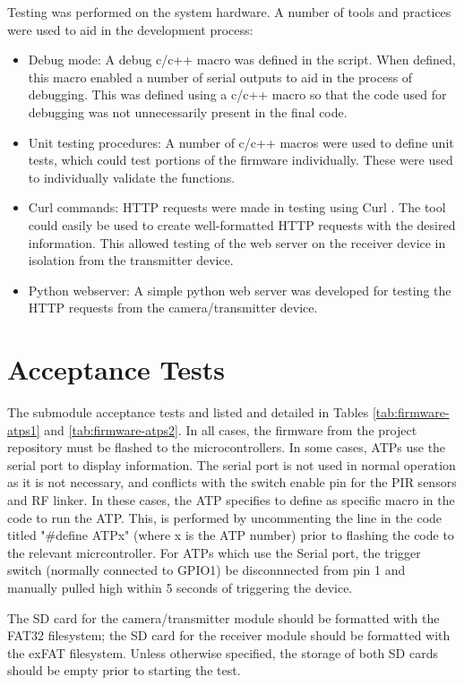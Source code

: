 \documentclass[class=report,11pt,crop=false]{standalone}
\begin{document}
Testing was performed on the system hardware. A number of tools and practices were used to aid in the development process:

\begin{itemize}
    \item Debug mode: A debug c/c++ macro was defined in the script. When defined, this macro enabled a number of serial outputs to aid in the process of debugging. This was defined using a c/c++ macro so that the code used for debugging was not unnecessarily present in the final code.
    \item Unit testing procedures: A number of c/c++ macros were used to define unit tests, which could test portions of the firmware individually. These were used to individually validate the functions.
    \item Curl commands: HTTP requests were made in testing using Curl \cite{hostetter1997curl}. The tool could easily be used to create well-formatted HTTP requests with the desired information. This allowed testing of the web server on the receiver device in isolation from the transmitter device.
    \item Python webserver: A simple python web server was developed for testing the HTTP requests from the camera/transmitter device.
\end{itemize}


\section{Acceptance Tests \label{s:firmware-atps}}

The submodule acceptance tests and listed and detailed in Tables \ref{tab:firmware-atps1} and \ref{tab:firmware-atps2}. In all cases, the firmware from the project repository must be flashed to the microcontrollers. In some cases, ATPs use the serial port to display information. The serial port is not used in normal operation as it is not necessary, and conflicts with the switch enable pin for the PIR sensors and RF linker.  In these cases, the ATP specifies to define as specific macro in the code to run the ATP. This, is performed by uncommenting the line in the code titled "\#define ATPx" (where x is the ATP number) prior to flashing the code to the relevant micrcontroller. For ATPs which use the Serial port, the trigger switch (normally connected to GPIO1) be disconnnected from pin 1 and manually pulled high within 5 seconds of triggering the device.

The SD card for the camera/transmitter module should be formatted with the FAT32 filesystem; the SD card for the receiver module should be formatted with the exFAT filesystem. Unless otherwise specified, the storage of both SD cards should be empty prior to starting the test.
\end{document}
